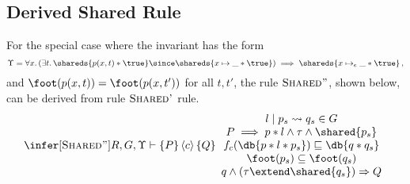 \subsection{Derived Shared Rule}
For the special case where the invariant has the form 
\[
\Upsilon = \forall x.\,(\exists t.\, \shareds{p(x,t)*\true} \since \shareds{x \mapsto \_*\true}) \implies \shareds{x \mapsto_e \_*\true}\,,
\]
and $\foot(p(x,t)) = \foot(p(x,t'))$ for all $t,t'$,
the rule $\textsc{Shared''}$, shown below, can be  
derived from rule $\textsc{Shared'}$ rule.
\[
\begin{array}{c}
%
\infer[\textsc{Shared''}]{
R, G, \Upsilon \vdash 
\{P \}
\, \langle c \rangle\, 
\{ Q \} %
}{
\begin{array}{c}  
l \mid p_s \leadsto q_s \in G
\\
P  \implies  p * l \wedge \tau \wedge \shared{p_s}
\\
f_c(\db{p * l * p_s}) \sqsubseteq \db{q * q_s}
\\
\foot(p_s) \subseteq \foot(q_s)
\\
q \wedge (\tau \extend \shared{q_s})
\Rightarrow  
Q
\end{array}
}
%  
\end{array}
\]



